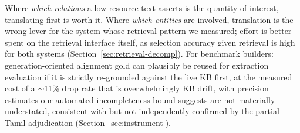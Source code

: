 \documentclass{llncs}
\begin{document}
Where \emph{which relations} a low-resource text asserts
is the quantity of interest, translating first is worth it. Where
\emph{which entities} are involved, translation is the wrong lever for the
system whose retrieval pattern we measured; effort is better spent on the
retrieval interface itself, as selection accuracy given retrieval is high for both systems
(Section~\ref{sec:retrieval-decomp}).
For benchmark builders: generation-oriented
alignment gold can plausibly be reused for extraction evaluation if it is
strictly re-grounded against the live KB first, at the measured cost of a
$\sim$11\% drop rate that is overwhelmingly KB drift, with precision
estimates our automated incompleteness bound suggests are not materially
understated, consistent with but not independently confirmed by the
partial Tamil adjudication (Section~\ref{sec:instrument}).
\end{document}
